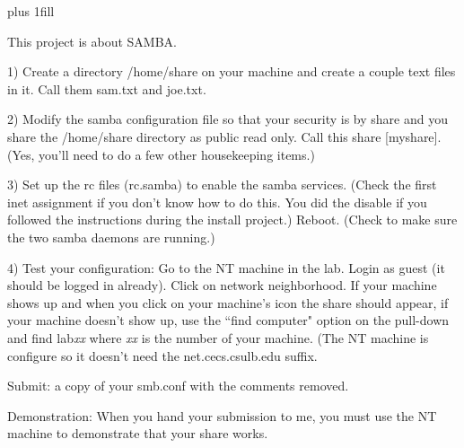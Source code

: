 
\rightskip=0pt plus 1fill

\parindent 0pt

This project is about SAMBA.

1) Create a directory {\ltt{}/home/share} on your machine and
create a couple text files in it. Call them {\ltt{}sam.txt} and 
{\ltt{}joe.txt}.

2) Modify the samba configuration file so that your security is by
share and you share the {\ltt{}/home/share} directory as public
read only. Call this share {\ltt{}[myshare]}. (Yes, you'll need
to do a few other housekeeping items.)

3) Set up the rc files ({\ltt{}rc.samba}) to enable the samba services.
(Check the first inet assignment if you don't know how to do this.
You did the disable if you followed the instructions during the install
project.) Reboot. (Check to make sure the two samba daemons are running.)

4) Test your configuration: Go to the NT machine in the lab.
Login as guest (it should be logged in already). Click on network 
neighborhood. If your machine shows up and when you click on
your machine's icon the share should appear, if your
machine doesn't show up, use the ``find computer" option on the pull-down
and find {\ltt{}lab}{\it{}xx} where {\it xx} is the number of your machine.
(The NT machine is configure so it doesn't need the {\ltt{}net.cecs.csulb.edu}
suffix.

Submit: a copy of your smb.conf with the comments removed.

Demonstration: When you hand your submission to me, you must use the NT machine
to demonstrate that your share works.
\bye
